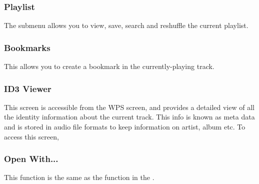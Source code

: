 	\subsubsection{Playlist}
	The  submenu allows you to view, save, search and reshuffle the current 
	playlist.
	
	\subsubsection{Bookmarks}
	This allows you to create a bookmark in the currently-playing track.

	\subsubsection{\label{ref:ID3viewer}ID3 Viewer}
	This screen is accessible from the WPS screen, and provides a detailed view of
	all the identity information about the current track. This info is known as
	meta data and is stored in audio file formats to keep information on artist,
	album etc. To access this screen, 
	
	\subsubsection{Open With...}
	This  function is the same as the  function
	in the \setting{File Context Menu}.
	
